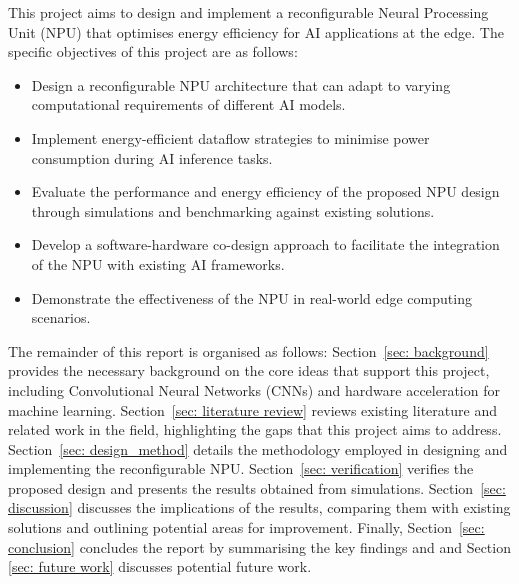 \documentclass[12pt, a4paper, ukenglish]{article}
\begin{document}
    This project aims to design and implement a reconfigurable Neural Processing Unit (NPU) that optimises energy efficiency for AI applications at the edge. The specific objectives of this project are as follows:
    \begin{itemize}
        \item Design a reconfigurable NPU architecture that can adapt to varying computational requirements of different AI models.
        \item Implement energy-efficient dataflow strategies to minimise power consumption during AI inference tasks.
        \item Evaluate the performance and energy efficiency of the proposed NPU design through simulations and benchmarking against existing solutions.
        \item Develop a software-hardware co-design approach to facilitate the integration of the NPU with existing AI frameworks.
        \item Demonstrate the effectiveness of the NPU in real-world edge computing scenarios.
    \end{itemize}



    The remainder of this report is organised as follows: Section~\ref{sec: background} provides the necessary background on the core ideas that support this project, including Convolutional Neural Networks (CNNs) and hardware acceleration for machine learning. Section~\ref{sec: literature review} reviews existing literature and related work in the field, highlighting the gaps that this project aims to address. Section~\ref{sec: design_method} details the methodology employed in designing and implementing the reconfigurable NPU. Section~\ref{sec: verification} verifies the proposed design and presents the results obtained from simulations. Section~\ref{sec: discussion} discusses the implications of the results, comparing them with existing solutions and outlining potential areas for improvement. Finally, Section~\ref{sec: conclusion} concludes the report by summarising the key findings and and Section \ref{sec: future work} discusses potential future work.

\clearpage  
\newpage
\end{document}
